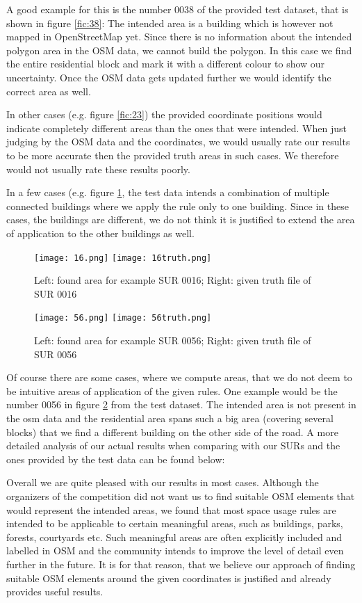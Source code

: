 \documentclass[11pt,fleqn]{book} %
\newcommand{\todol}{\todo[inline]} %
\begin{document}
A good example for this is the number 0038 of the provided test dataset, that is shown in figure \ref{fic:38}: The intended area is a building which is however not mapped in OpenStreetMap yet. Since there is no information about the intended polygon area in the OSM data, we cannot build the polygon. In this case we find the entire residential block and mark it with a different colour to show our uncertainty. Once the OSM data gets updated further we would identify the correct area as well.

In other cases (e.g. figure \ref{fic:23}) the provided coordinate positions would indicate completely different areas than the ones that were intended. When just judging by the OSM data and the coordinates, we would usually rate our results to be more accurate then the provided truth areas in such cases. We therefore would not usually rate these results poorly. 

In a few cases (e.g. figure \ref{fic:16}, the test data intends a combination of multiple connected buildings where we apply the rule only to one building. Since in these cases, the buildings are different, we do not think it is justified to extend the area of application to the other buildings as well. 

\begin{figure}[h]
\texttt{[image: 16.png]}
\texttt{[image: 16truth.png]}
\caption{Left: found area for example SUR 0016; Right: given truth file of SUR 0016}
\label{fic:16}
\end{figure}
\begin{figure}
\texttt{[image: 56.png]}
\texttt{[image: 56truth.png]}
\caption{Left: found area for example SUR 0056; Right: given truth file of SUR 0056}
\label{fic:56}
\end{figure}

Of course there are some cases, where we compute areas, that we do not deem to be intuitive areas of application of the given rules. One example would be the number 0056 in figure \ref{fic:56} from the test dataset. The intended area is not present in the osm data and the residential area spans such a big area (covering several blocks) that we find a different building on the other side of the road. 
A more detailed analysis of our actual results when comparing with our SURs and the ones provided by the test data can be found below:
\todol{Daten einfügen}


Overall we are quite pleased with our results in most cases. Although the organizers of the competition did not want us to find suitable OSM elements that would represent the intended areas, we found that most space usage rules are intended to be applicable to certain meaningful areas, such as buildings, parks, forests, courtyards etc. Such meaningful areas are often explicitly included and labelled in OSM and the community intends to improve the level of detail even further in the future. It is for that reason, that we believe our approach of finding suitable OSM elements around the given coordinates is justified and already provides useful results. 
\end{document}
